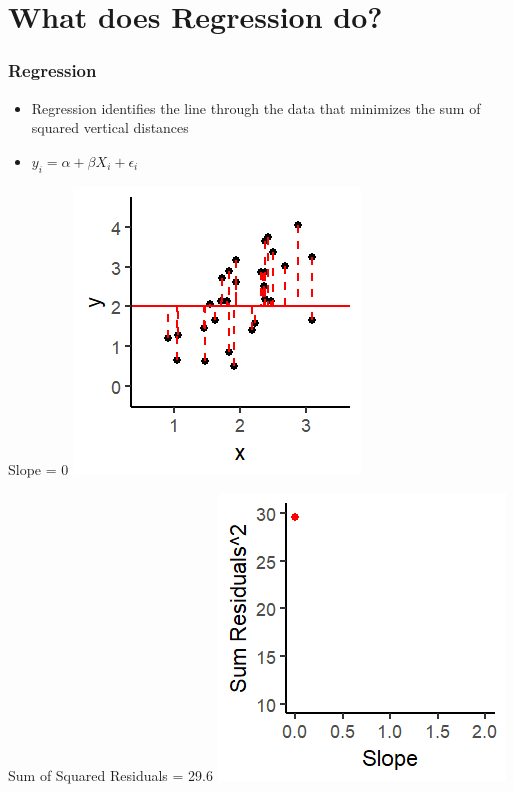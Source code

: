 \documentclass[xcolor=x11names,compress]{beamer}\usepackage[]{graphicx}\usepackage[]{color}
\makeatletter
\def\maxwidth{ %
  \ifdim\Gin@nat@width>\linewidth
    \linewidth
  \else
    \Gin@nat@width
  \fi
}
\newenvironment{knitrout}{}{} %
\renewcommand{\(}{\begin{columns}}
\renewcommand{\)}{\end{columns}}
\newcommand{\<}[1]{\begin{column}{#1}}
\renewcommand{\>}{\end{column}}
\makeatother
\begin{document}

\section{What does Regression do?}




\begin{frame}
\frametitle{Regression}
\begin{itemize}
\item Regression identifies the line through the data that minimizes the sum of squared vertical distances 
\pause
\item $y_i = \alpha + \beta X_i + \epsilon_i$
\pause
\end{itemize}
\begin{multicols}{2}
Slope = 0
\begin{knitrout}
\color{fgcolor}
\includegraphics[width=\maxwidth]{figure/graph_ols1-1} 

\end{knitrout}
\columnbreak
Sum of Squared Residuals = 29.6
\begin{knitrout}
\color{fgcolor}
\includegraphics[width=\maxwidth]{figure/graph_ssr1-1} 

\end{knitrout}
\end{multicols}
\end{frame}
\end{document}
